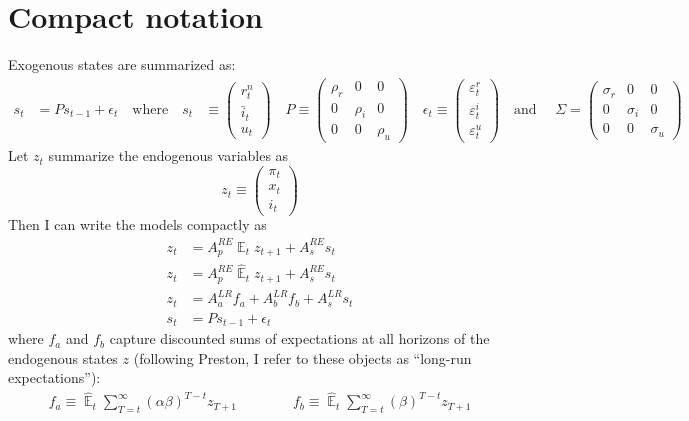 \documentclass[11pt]{article}
\renewcommand{\[}{\begin{equation}}
\renewcommand{\]}{\end{equation}}
\DeclareMathOperator{\E}{\mathbb{E}}
\begin{document}
 \section{Compact notation}
Exogenous states are summarized as:
 \begin{align*}
 s_t & = P s_{t-1} + \epsilon_t 
 \quad \text{where} \quad 
 s_t & \equiv \begin{pmatrix} r_t^n \\ \bar{i}_t \\ u_t 
 \end{pmatrix} \quad 
 P  \equiv \begin{pmatrix} \rho_r & 0 & 0 \\ 0& \rho_i & 0 \\ 0&0& \rho_u 
 \end{pmatrix}  \quad 
 \epsilon_t \equiv \begin{pmatrix}\varepsilon_t^{r} \\ \varepsilon_t^{i}  \\ \varepsilon_t^{u} 
 \end{pmatrix}  \quad  \text{and } \quad \Sigma  =  \begin{pmatrix} \sigma_r & 0 & 0 \\ 0& \sigma_i & 0 \\ 0&0& \sigma_u 
 \end{pmatrix} 
 \end{align*}
 Let $z_t$ summarize the endogenous variables as
 \begin{equation}
 z_t \equiv \begin{pmatrix} \pi_t \\ x_t \\ i_t
 \end{pmatrix}
 \end{equation}
 Then I can write the models compactly as
 \begin{align}
z_t & = A_p^{RE} \E_t z_{t+1} + A_s^{RE} s_t \label{LOM_RE} \\
z_t & = A_p^{RE} \hat{\E}_t z_{t+1} + A_s^{RE} s_t \label{LOM_EE} \\
z_t & = A_a^{LR} f_a + A_b^{LR} f_b + A_s^{LR} s_t \label{LOM_LR} \\
s_t & = P s_{t-1} + \epsilon_t \label{exog}
\end{align}
 where $f_a$ and $f_b$ capture discounted sums of expectations at all horizons of the endogenous states $z$ (following Preston, I refer to these objects as ``long-run expectations''):
  \begin{align}
f_a  \equiv  \hat{\E}_t\sum_{T=t}^{\infty} (\alpha\beta)^{T-t } z_{T+1} \quad \quad \quad \quad f_b  \equiv \hat{\E}_t\sum_{T=t}^{\infty} (\beta)^{T-t } z_{T+1} \label{fafb}
\end{align}
\end{document}
